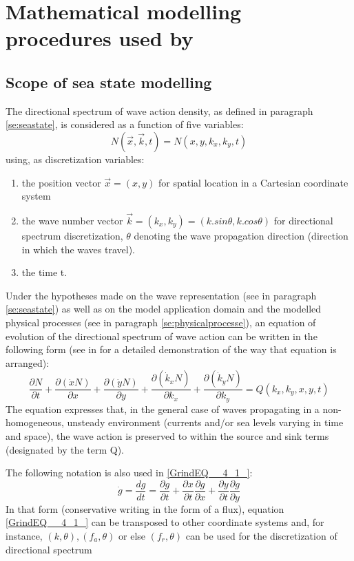 
\chapter{Mathematical modelling procedures used by \tomawac}
\label{chapter4}
\section{ Scope of sea state modelling}
The directional spectrum of wave action density, as defined in paragraph
\ref{se:seastate}, is considered as a function of five variables:
\[N(\vec{x},\vec{k},t)=N(x,y,k_{x} ,k_{y} ,t)\]
using,
as discretization variables:

 \begin{enumerate}
 \item the position vector $\vec{x} = (x, y)$ for spatial location in a
   Cartesian coordinate system

 \item the wave number vector $\vec{k} = (k_x, k_y) = (k.sin \theta, k.cos
   \theta)$ for directional spectrum discretization, $\theta$ denoting the
   wave propagation direction (direction in which the waves travel).

 \item the time t.
\end{enumerate}

 Under the hypotheses made on the wave representation (see in paragraph
 \ref{se:seastate}) as well as on the model application domain and the
 modelled physical processes (see in paragraph \ref{se:physicalprocesse}),
 an equation of evolution of the directional spectrum of wave action can be
 written in the following form (see in \cite{Willebrand1975}
 \cite{Phillips1977} \cite{Bretherton1969} for a detailed demonstration
 of the way that equation is arranged):
\begin{equation} \label{GrindEQ__4_1_}
  \frac{\partial N}{\partial t} +\frac{\partial (\dot{x}N)}{\partial x} +
  \frac{\partial (\dot{y}N)}{\partial y} +\frac{\partial (\dot{k}_{x} N)}
       {\partial k_{x} } +\frac{\partial (\dot{k}_{y} N)}{\partial k_{y} } =
       Q(k_{x} ,k_{y} ,x,y,t)
\end{equation}
The equation expresses that, in the general case of waves propagating in a
non-homogeneous, unsteady environment (currents and/or sea levels varying in
time and space), the wave action is preserved to within the source and sink
terms (designated by the term Q).

 The following notation is also used in \eqref{GrindEQ__4_1_}:
 \[\dot{g}=\frac{dg}{dt} =\frac{\partial g}{\partial t} +\frac{\partial x}
 {\partial t} \frac{\partial g}{\partial x} +\frac{\partial y} {\partial t}
 \frac{\partial g}{\partial y} \]
 In that form (conservative writing in the form of a flux), equation
 \eqref{GrindEQ__4_1_} can be transposed to other coordinate systems and, for
 instance, $(k,\theta), (f_a,\theta)$ or else $(f_r,\theta)$ can be used for
 the discretization of directional spectrum \cite{Komen1994} \cite{Tolman1991}

